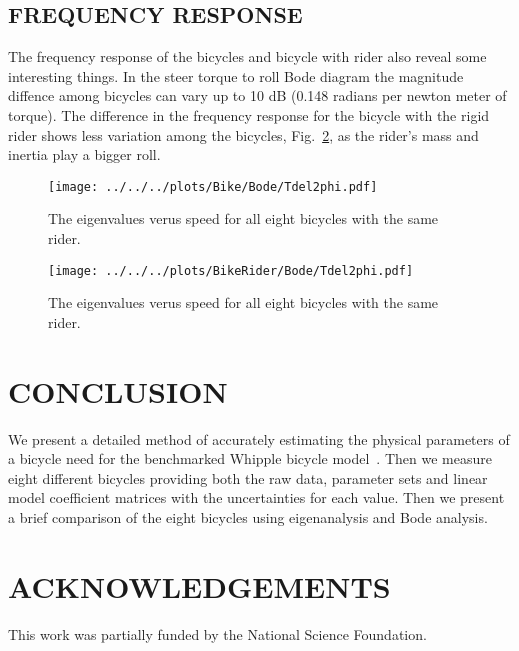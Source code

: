 \documentclass{bmd2010p}
\begin{document}
\subsection{FREQUENCY RESPONSE}
The frequency response of the bicycles and bicycle with rider also reveal some
interesting things. In the steer torque to roll Bode diagram the magnitude
diffence among bicycles can vary up to 10 dB (0.148 radians per newton meter of
torque). The difference in the frequency response for the bicycle with the
rigid rider shows less variation among the bicycles,
Fig.~\ref{fig:bikeRiderBode}, as the rider's mass and
inertia play a bigger roll.
\begin{figure}[tbp]
    \centering
    \texttt{[image: ../../../plots/Bike/Bode/Tdel2phi.pdf]}
    \caption{The eigenvalues verus speed for all eight bicycles with the same
    rider.}
    \label{fig:bikeBode}
\end{figure}
\begin{figure}[tbp]
    \centering
    \texttt{[image: ../../../plots/BikeRider/Bode/Tdel2phi.pdf]}
    \caption{The eigenvalues verus speed for all eight bicycles with the same
    rider.}
    \label{fig:bikeRiderBode}
\end{figure}
\section{CONCLUSION}
We present a detailed method of accurately estimating the physical parameters
of a bicycle need for the benchmarked Whipple bicycle
model~\cite{Meijaard2007}. Then we measure eight different bicycles providing
both the raw data, parameter sets and linear model coefficient matrices with
the uncertainties for each value. Then we present a brief comparison of the
eight bicycles using eigenanalysis and Bode analysis.
\section{ACKNOWLEDGEMENTS}
This work was partially funded by the National Science Foundation.
\end{document}
